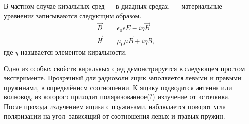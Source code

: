В частном случае киральных сред --- в диадных средах, --- материальные уравнения записываются следующим образом:
\begin{align*}
	\vec{D} &= \epsilon_0\epsilon E - i\eta\vec{H} \\
	\vec{H} &= \mu_0\mu\vec{B} + i\eta{B},
\end{align*}
где \(\eta\) называется элементом киральности.

Одно из особых свойств киральных сред демонстрируется в следующем простом эксперименте.
Прозрачный для радиоволн ящик заполняется левыми и правыми пружинами, в определённом соотношении.
К ящику подводится антенна или волновод, из которого приходит поляризованное(?) излучение от источника.
После прохода излучением ящика с пружинами, наблюдается поворот угла поляризации на угол, зависящий от соотношения
левых и правых пружин.


